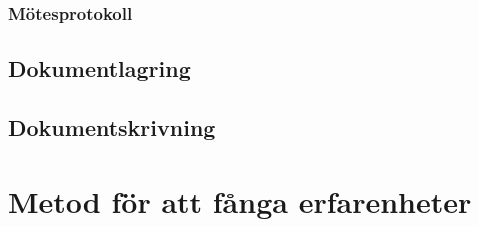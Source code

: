 \subsubsection*{Mötesprotokoll}

\subsection{Dokumentlagring}

\subsection{Dokumentskrivning}

\section{Metod för att fånga erfarenheter}




